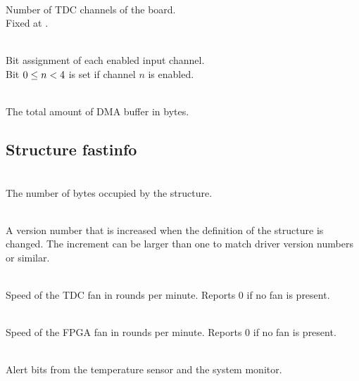 \\
Number of TDC channels of the board.\\
Fixed at .\par

\\
Bit assignment of each enabled input channel.\\
Bit $0 \leq n < \ifxHPTDC{8}{4}$ is set if channel $n$ is enabled. \par

\\
The total amount of DMA buffer in bytes.



\subsection{Structure \prefix fast\tu info}
\label{structfastinfo}
\\
The number of bytes occupied by the structure. \par

\\
A version number that is increased when the definition of the structure is changed. 
The increment can be larger than one to match driver version numbers or similar.\par

\ifxHPTDC{} {
    \\
    Speed of the TDC fan in rounds per minute. Reports 0 if no fan is present.\par
}
\\
Speed of the FPGA fan in rounds per minute. Reports 0 if no fan is present.\par

\\
Alert bits from the temperature sensor and the system monitor.
\par

